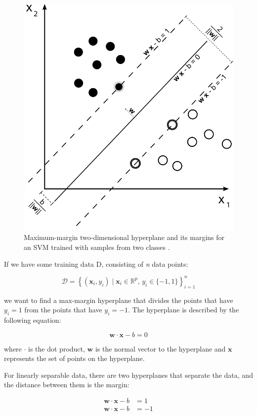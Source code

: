 \begin{figure}[h]
\begin{center}
\includegraphics[width=0.7\columnwidth]{img/svm_max_margin.png}
\caption{
\label{fig:svm_max_margin}
Maximum-margin two-dimensional hyperplane and its margins for an SVM trained with samples from two classes \cite{svm_max_margin}.
}
\end{center}
\end{figure}

If we have some training data D, consisting of \textit{n} data points:

\[
	\mathcal{D} = \left\{ (\mathbf{x}_i, y_i)\mid\mathbf{x}_i \in \mathbb{R}^p,\, y_i \in \{-1,1\}\right\}_{i=1}^n
\]

we want to find a max-margin hyperplane that divides the points that have $ y_i = 1 $ from the points that have $ y_i = -1 $. The hyperplane is described by the following equation:

\begin{equation}
\label{eq:svm_hyperplane}
\mathbf{w}\cdot\mathbf{x} - b=0
\end{equation}

where $ \cdot $ is the dot product, $ \mathbf{w} $ is the normal vector to the hyperplane and $ \mathbf{x} $ represents the set of points on the hyperplane. 

For linearly separable data, there are two hyperplanes that separate the data, and the distance between them is the margin: 

\begin{align*} 
 \mathbf{w}\cdot\mathbf{x} - b &=1 \\
 \mathbf{w}\cdot\mathbf{x} - b &=-1
\end{align*}

